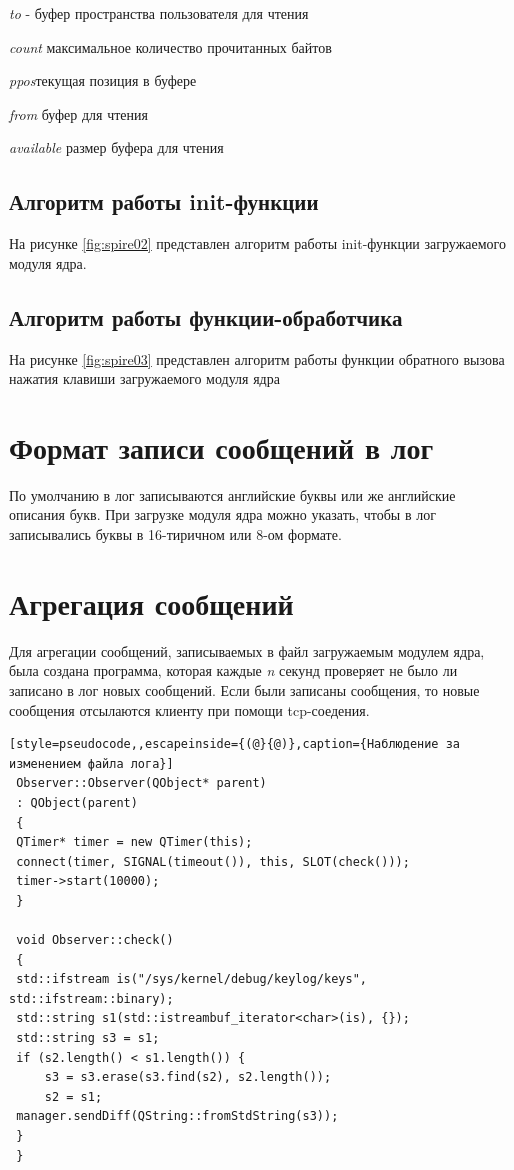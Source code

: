 \textit{to} - буфер пространства пользователя для чтения\cite{book3}

\textit{count} максимальное количество прочитанных байтов

\textit{ppos}текущая позиция в буфере

\textit{from} буфер для чтения

\textit{available} размер буфера для чтения
\subsection{Алгоритм работы init-функции}
На рисунке \ref{fig:spire02} представлен алгоритм работы init-функции загружаемого модуля ядра.

\subsection{Алгоритм работы функции-обработчика }
На рисунке \ref{fig:spire03} представлен алгоритм работы функции обратного вызова нажатия клавиши загружаемого модуля ядра

\section{Формат записи сообщений в лог}
По умолчанию в лог записываются английские буквы или же английские описания букв. При загрузке модуля ядра можно указать, чтобы в лог записывались буквы в 16-тиричном или 8-ом формате.
\section{Агрегация сообщений}
Для агрегации сообщений, записываемых в файл загружаемым модулем ядра, была создана программа, которая каждые \textit{n} секунд проверяет не было ли записано в лог новых сообщений. Если были записаны сообщения, то новые сообщения отсылаются клиенту при помощи tcp-соедения.
 \begin{lstlisting}[style=pseudocode,,escapeinside={(@}{@)},caption={Наблюдение за изменением файла лога}] 
 Observer::Observer(QObject* parent)
 : QObject(parent)
 {
 QTimer* timer = new QTimer(this);
 connect(timer, SIGNAL(timeout()), this, SLOT(check()));
 timer->start(10000);
 }
 
 void Observer::check()
 {
 std::ifstream is("/sys/kernel/debug/keylog/keys", std::ifstream::binary);
 std::string s1(std::istreambuf_iterator<char>(is), {});
 std::string s3 = s1;
 if (s2.length() < s1.length()) {
     s3 = s3.erase(s3.find(s2), s2.length());
     s2 = s1;
 manager.sendDiff(QString::fromStdString(s3));
 }
 }
 \end{lstlisting}

